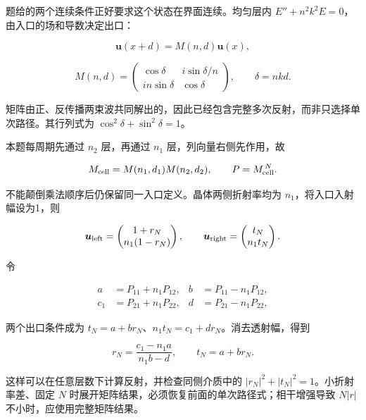\documentclass[12pt,a4paper,fontset=fandol]{ctexart}
\begin{document}
题给的两个连续条件正好要求这个状态在界面连续。均匀层内
\(E''+n^2k^2E=0\)，由入口的场和导数决定出口：

\[
\boldsymbol u(x+d)=M(n,d)\boldsymbol u(x),
\]

\[
M(n,d)=
\begin{pmatrix}
\cos\delta&i\sin\delta/n\\
in\sin\delta&\cos\delta
\end{pmatrix},\qquad \delta=nkd.
\]

矩阵由正、反传播两束波共同解出的，因此已经包含完整多次反射，而非只选择单次路径。其行列式为
\(\cos^2\delta+\sin^2\delta=1\)。

本题每周期先通过 \(n_2\) 层，再通过 \(n_1\) 层，列向量右侧先作用，故

\[
M_{\rm cell}=M(n_1,d_1)M(n_2,d_2),\qquad
P=M_{\rm cell}^{\,N}.
\]

不能颠倒乘法顺序后仍保留同一入口定义。晶体两侧折射率均为
\(n_1\)，将入口入射幅设为1，则

\[
\boldsymbol u_{\rm left}
=\begin{pmatrix}1+r_N\\n_1(1-r_N)\end{pmatrix},\qquad
\boldsymbol u_{\rm right}
=\begin{pmatrix}t_N\\n_1t_N\end{pmatrix}.
\]

令

\[
\begin{aligned}
a&=P_{11}+n_1P_{12},& b&=P_{11}-n_1P_{12},\\
c_1&=P_{21}+n_1P_{22},& d&=P_{21}-n_1P_{22},
\end{aligned}
\]

两个出口条件成为 \(t_N=a+br_N\)、\(n_1t_N=c_1+dr_N\)。消去透射幅，得到

\[
r_N=\frac{c_1-n_1a}{n_1b-d},\qquad
t_N=a+br_N.
\]

这样可以在任意层数下计算反射，并检查同侧介质中的
\(|r_N|^2+|t_N|^2=1\)。小折射率差、固定 \(N\)
时展开矩阵结果，必须恢复前面的单次路径式；相干增强导致 \(N|r|\)
不小时，应使用完整矩阵结果。
\end{document}
